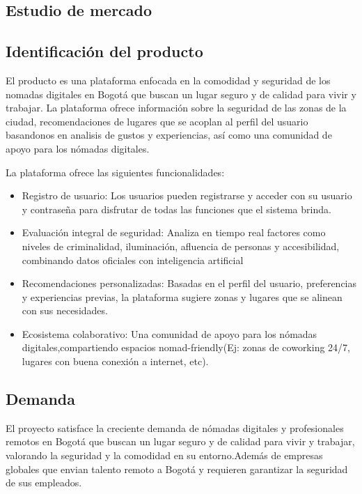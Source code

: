 \subsection{Estudio de mercado}
\subsection*{Identificación del producto}
El producto es una plataforma enfocada en la comodidad y seguridad de los nomadas digitales en Bogotá que buscan un lugar seguro y de calidad para vivir y trabajar. La plataforma ofrece información sobre la seguridad de las zonas de la ciudad, recomendaciones de lugares que se acoplan al perfil del usuario basandonos en analisis de gustos y experiencias, así como una comunidad de apoyo para los nómadas digitales.

La plataforma ofrece las siguientes funcionalidades:
\begin{itemize}
    \item Registro de usuario: Los usuarios pueden registrarse y acceder con su usuario y contraseña para disfrutar de todas las funciones que el sistema brinda.
    
    \item Evaluación integral de seguridad: Analiza en tiempo real factores como niveles de criminalidad, iluminación, afluencia de personas y accesibilidad, combinando datos oficiales con inteligencia artificial
    \item Recomendaciones personalizadas: Basadas en el perfil del usuario, preferencias y experiencias previas, la plataforma sugiere zonas y lugares que se alinean con sus necesidades.
    \item Ecosistema colaborativo: Una comunidad de apoyo para los nómadas digitales,compartiendo espacios nomad-friendly(Ej: zonas de coworking 24/7, lugares con buena conexión a internet, etc).
\end{itemize}

\subsection*{Demanda}
El proyecto satisface la creciente demanda de nómadas digitales y profesionales remotos en Bogotá que buscan un lugar seguro y de calidad para vivir y trabajar, valorando la seguridad y la comodidad en su entorno.Además de empresas globales que envian talento remoto a Bogotá y requieren garantizar la seguridad de sus empleados.

